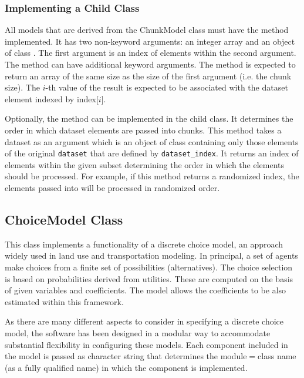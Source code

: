 {\subsubsection{Implementing a Child Class}
%
All models that are derived from the ChunkModel class must have the method  implemented. 
It has two non-keyword arguments: an integer array and an object of class . The first argument 
is an index of elements within the second argument. The method can have additional keyword arguments.  
The method is expected to return an array of the same size as the size of the first argument (i.e. the chunk size).
The $i$-th value of the result is expected to be associated with the dataset element indexed by index[$i$].

Optionally, the method   can be implemented in the child class. It determines the order in which 
dataset elements are passed into chunks. This method takes a dataset \datasetindex as an argument which is an
object of class  \datasetsubsetindex containing only those elements of the
original \verb|dataset| \datasetindex that are defined by \verb|dataset_index|. \datasetindex It returns
an index of elements within the given subset determining the order in which the
elements should be processed. For example, if this method returns a randomized
index, the elements passed into  will be processed in
randomized order.



\subsection{ChoiceModel Class}
\label{sec:choice-model}
%
This class implements a functionality of a discrete choice model, an approach
widely used in land use and transportation modeling. In principal, a set of
agents make choices from a finite set of possibilities (alternatives). The
choice selection is based on probabilities derived from utilities. These are
computed on the basis of given variables \variablesindex and coefficients. \coefficientsindex The model allows
the coefficients \coefficientsindex to be also estimated within this framework.

As there are many different aspects to consider in specifying a discrete
choice model, the software has been designed in a modular way to accommodate
substantial flexibility in configuring these models. Each component included
in the model is passed as character string that determines the module$=$class
name (as a fully qualified name) in which the component is implemented.

}
